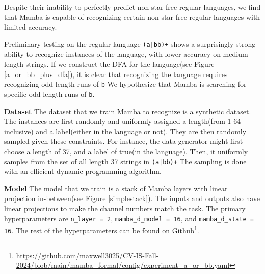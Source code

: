 Despite their inability to perfectly predict non-star-free regular languages,
we find that Mamba is capable of recognizing certain non-star-free regular
languages with limited accuracy.

Preliminary testing on the regular language \texttt{(a|bb)+} shows a
surprisingly strong ability to recognize instances of the language, with lower
accuracy on medium-length strings.
If we construct the DFA for the language(see Figure \ref{a_or_bb_plus_dfa}), it
is clear that recognizing
the language requires recognizing odd-length runs of \verb|b|
We hypothesize that Mamba is searching for specific odd-length runs of \verb|b|.

\textbf{Dataset} The dataset that we train Mamba to recognize is a synthetic
dataset.
The instances are first randomly and uniformly assigned a length(from 1-64
inclusive) and a label(either in the language or not).
They are then randomly sampled given these constraints.
For instance, the data generator might first choose a length of 37, and a label
of true(in the language).
Then, it uniformly samples from the set of all length 37 strings in
\texttt{(a|bb)+}
The sampling is done with an efficient dynamic programming algorithm.

\textbf{Model} The model that we train is a stack of Mamba layers with linear
projection in-between(see Figure \ref{simplestack}).
The inputs and outputs also have linear projections to make the channel numbers
match the task.
The primary hyperparameters are \verb|n_layer = 2|, \verb|mamba_d_model = 16|,
and \verb|mamba_d_state = 16|.
The rest of the hyperparameters can be found on
Github\footnote{\url{https://github.com/maxwell3025/CV-IS-Fall-2024/blob/main/mamba_formal/config/experiment_a_or_bb.yaml}}.

